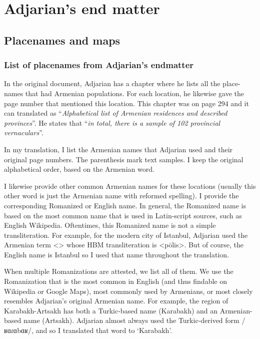 \part{Adjarian's end matter}
\chapter{Placenames and maps }


\section{List of placenames from Adjarian's endmatter}
In the original document, Adjarian has a chapter where he lists all the place-names that had Armenian populations. For each location, he likewise gave the page number that mentioned this location.  This chapter was on page   294 and it can translated as ``\textit{Alphabetical list of Armenian residences and described provinces}''. He states that ``\textit{in total, there is a sample of 102 provincial vernaculars}''. 

In my translation, I list the Armenian names that Adjarian used and their original page numbers. The parenthesis mark text samples. I keep the original alphabetical order, based on the Armenian word.

I likewise provide other common Armenian names for these locations (usually this other word is just the Armenian name with reformed spelling). I provide  the corresponding Romanized or English name. In general, the Romanized name is based on the most common name that is used in Latin-script sources, such as English Wikipedia. Oftentimes, this Romanized name is not a simple transliteration. For example, for the modern city of Istanbul, Adjarian used the Armenian term  <> whose HBM transliteration is <pōlis>. But of course, the English name is Istanbul so I used that name throughout the translation. 

When multiple Romanizations are attested, we list all of them. We use the Romanization that is the most common in English (and thus findable on Wikipedia or Google Maps), most commonly used by Armenians, or most closely resembles Adjarian's original Armenian name. For example, the region of Karabakh-Artsakh has both a Turkic-based name (Karabakh) and an Armenian-based name (Artsakh). Adjarian almost always used the Turkic-derived form  /ʁɑɾɑbɑʁ/, and so I translated that word to `Karabakh'. 

